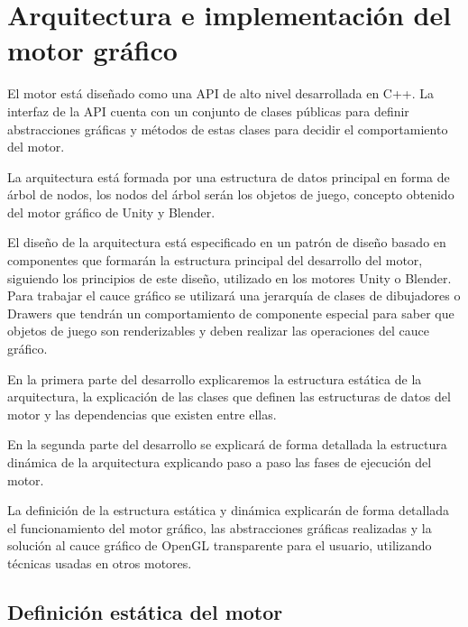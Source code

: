 \documentclass[a4paper, 17pt]{book}
\begin{document}

\cleardoublepage
\chapter{Arquitectura e implementación del motor gráfico}

El motor está diseñado como una API de alto nivel desarrollada en C++. La interfaz de la API cuenta con un conjunto
de clases públicas para definir abstracciones gráficas y métodos de estas clases para decidir el comportamiento del motor.

La arquitectura está formada por una estructura de datos principal en forma de árbol de nodos, los nodos del árbol
serán los objetos de juego, concepto obtenido del motor gráfico de Unity y Blender.

El diseño de la arquitectura está especificado en un patrón de diseño basado en componentes que formarán la estructura
principal del desarrollo del motor, siguiendo los principios de este diseño, utilizado en los motores Unity o Blender.
Para trabajar el cauce gráfico se utilizará una jerarquía de clases de dibujadores o Drawers que tendrán un comportamiento
de componente especial para saber que objetos de juego son renderizables y deben realizar las operaciones del cauce gráfico.

En la primera parte del desarrollo explicaremos la estructura estática de la arquitectura, la explicación de las clases que
definen las estructuras de datos del motor y las dependencias que existen entre ellas. 

En la segunda parte del desarrollo se explicará de forma detallada la estructura dinámica de la arquitectura explicando paso
a paso las fases de ejecución del motor.

La definición de la estructura estática y dinámica explicarán de forma detallada el funcionamiento del motor gráfico, las
abstracciones gráficas realizadas y la solución al cauce gráfico de OpenGL transparente para el usuario, utilizando técnicas
usadas en otros motores.

\section{Definición estática del motor} 
\label{sec:estatica}
\end{document}
